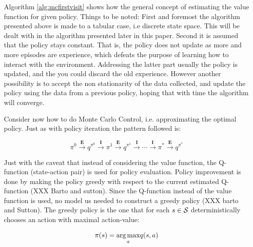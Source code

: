 Algorithm \ref{alg:mcfirstvisit} shows how the general concept of estimating the value function for given policy. Things to be noted: First and foremost the algorithm presented above is made to a tabular case, i.e discrete state space. This will be dealt with in the algorithm presented later in this paper. Second it is assumed that the policy stays constant. That is, the policy does not update as more and more episodes are experience, which defeats the purpose of learning how to interact with the environment. Addressing the latter part usually the policy is updated, and the you could discard the old experience. However another possibility is to accept the non stationarity of the data collected, and update the policy using the data from a previous policy, hoping that with time the algorithm will converge.

Consider now how to do Monte Carlo Control, i.e. approximating the optimal policy. Just as with policy iteration the pattern followed is:

\begin{equation}
    \label{eq:montecarlocontrol}
    \pi^0 \overset{\textbf{E}}{\longrightarrow}
    q^{\pi^0} \overset{\textbf{I}}{\longrightarrow} \pi^1 \overset{\textbf{E}}{\longrightarrow} q^{\pi^1} \overset{\textbf{I}}{\longrightarrow} \cdots \overset{\textbf{I}}{\longrightarrow} \pi^* \overset{\textbf{E}}{\longrightarrow} q^{\pi^*}
\end{equation}

Just with the caveat that instead of considering the value function, the Q-function (state-action pair) is used for policy evaluation. Policy improvement is done by making the policy greedy with respect to the current estimated Q-function (XXX Barto and sutton). Since the Q-function instead of the value function is used, no model us needed to construct a greedy policy (XXX barto and Sutton). The greedy policy is the one that for each $s \in \mathcal{S}$ deterministically chooses an action with maximal action-value:

\begin{equation}
    \pi(s) = \underset{a}{\operatorname*{arg\,max}}  q( s, a )
\end{equation}

